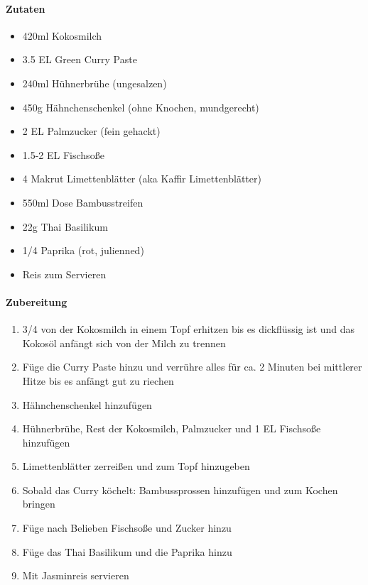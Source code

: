 \paragraph{Zutaten}
\begin{itemize}[noitemsep]
	\item 420ml Kokosmilch
	\item 3.5 EL Green Curry Paste 
	\item 240ml Hühnerbrühe (ungesalzen)
	\item 450g Hähnchenschenkel (ohne Knochen, mundgerecht)
	\item 2 EL Palmzucker (fein gehackt)
	\item 1.5-2 EL Fischsoße
	\item 4 Makrut Limettenblätter (aka Kaffir Limettenblätter)
	\item 550ml Dose Bambusstreifen
	\item 22g Thai Basilikum
	\item 1/4 Paprika (rot, julienned)
	\item Reis zum Servieren
\end{itemize}

\paragraph{Zubereitung}
\begin{enumerate}[noitemsep]
	\item 3/4 von der Kokosmilch in einem Topf erhitzen bis es dickflüssig ist und das Kokosöl anfängt sich von der Milch zu trennen 
	\item Füge die Curry Paste hinzu und verrühre alles für ca. 2 Minuten bei mittlerer Hitze bis es anfängt gut zu riechen
	\item Hähnchenschenkel hinzufügen 
	\item Hühnerbrühe, Rest der Kokosmilch, Palmzucker und 1 EL Fischsoße hinzufügen 
	\item Limettenblätter zerreißen und zum Topf hinzugeben
	\begin{description}[noitemsep]
		\item \rarrow Lasse den Blattstiel weg
	\end{description}
	\item Sobald das Curry köchelt: Bambussprossen hinzufügen und zum Kochen bringen
	\item Füge nach Belieben Fischsoße und Zucker hinzu
	\item Füge das Thai Basilikum und die Paprika hinzu
	\item Mit Jasminreis servieren
	
\end{enumerate}
